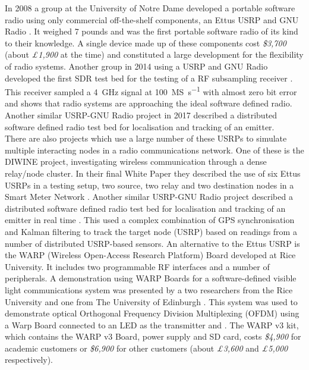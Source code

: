 \documentclass[../main.tex]{subfiles}
\begin{document}
In 2008 a group at the University of Notre Dame developed a portable software radio using only commercial off-the-shelf components, an Ettus USRP and GNU Radio \cite{web_PortableSR}.
It weighed 7 pounds and was the first portable software radio of its kind to their knowledge.
A single device made up of these components cost \textit{\$3,700} (about \textit{£1,900} at the time) and constituted a large development for the flexibility of radio systems.
Another group in 2014 using a USRP and GNU Radio developed the first SDR test bed for the testing of a RF subsampling receiver \cite{web_SDRTB_SubSamplingReceiver}.
This receiver sampled a \SI{4}{\giga\hertz} signal at \SI{100}{MS\per\second} with almost zero bit error and shows that radio systems are approaching the ideal software defined radio.
Another similar USRP-GNU Radio project in 2017 described a distributed software defined radio test bed for localisation and tracking of an emitter.\\

There are also projects which use a large number of these USRPs to simulate multiple interacting nodes in a radio communications network.
One of these is the DIWINE project, investigating wireless communication through a dense relay/node cluster.
In their final White Paper they described the use of six Ettus USRPs in a testing setup, two source, two relay and two destination nodes in a Smart Meter Network \cite{pap_DIWINEpaper4}.
Another similar USRP-GNU Radio project described a distributed software defined radio test bed for localisation and tracking of an emitter in real time \cite{pap_SDRTB_Localisation}.
This used a complex combination of GPS synchronisation and Kalman filtering to track the target node (USRP) based on readings from a number of distributed USRP-based sensors. 
An alternative to the Ettus USRP is the WARP (Wireless Open-Access Research Platform) Board developed at Rice University.
It includes two programmable RF interfaces and a number of peripherals.
A demonstration using WARP Boards for a software-defined visible light communications system was presented by a two researchers from the Rice University and one from The University of Edinburgh \cite{pap_WARP_light}.
This system was used to demonstrate optical Orthogonal Frequency Division Multiplexing (OFDM) using a Warp Board connected to an LED as the transmitter and .
The WARP v3 kit, which contains the WARP v3 Board, power supply and SD card, costs \textit{\$4,900} for academic customers or \textit{\$6,900} for other customers (about \textit{£3,600} and \textit{£5,000} respectively).\\
\end{document}
